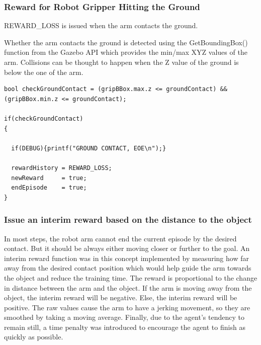 \documentclass[10pt,journal,compsoc]{IEEEtran}
\begin{document}
\subsubsection{Reward for Robot Gripper Hitting the Ground}

REWARD\_LOSS is issued when the arm contacts the ground.

Whether the arm contacts the ground is detected using the GetBoundingBox() function from the Gazebo API which provides the min/max XYZ values of the arm. Collisions can be thought to happen when the Z value of the ground is below the one of the arm.

\begin{lstlisting}
bool checkGroundContact = (gripBBox.max.z <= groundContact) && (gripBBox.min.z <= groundContact);

if(checkGroundContact)
{

  if(DEBUG){printf("GROUND CONTACT, EOE\n");}

  rewardHistory = REWARD_LOSS;
  newReward     = true;
  endEpisode    = true;
}
\end{lstlisting}

\subsubsection{Issue an interim reward based on the distance to the object}

In most steps, the robot arm cannot end the current episode by the desired contact. But it should be always either moving closer or further to the goal. An interim reward function was in this concept implemented by measuring how far away from the desired contact position which would help guide the arm towards the object and reduce the training time. The reward is proportional to the change in distance between the arm and the object. If the arm is moving away from the object, the interim reward will be negative. Else, the interim reward will be positive. The raw values cause the arm to have a jerking movement, so they are smoothed by taking a moving average. Finally, due to the agent's tendency to remain still, a time penalty was introduced to encourage the agent to finish as quickly as possible.
\end{document}

